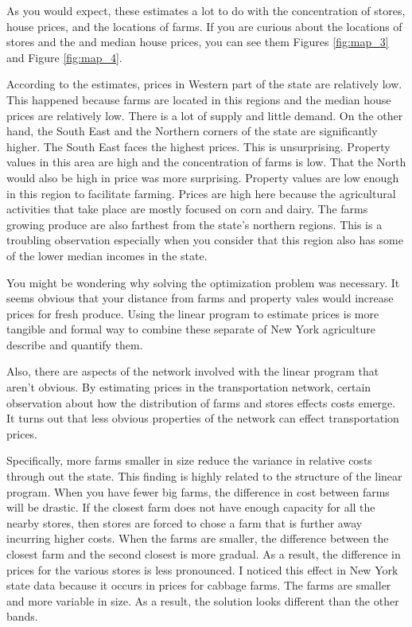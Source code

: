 \documentclass{report}
\begin{document}
As you would expect, these estimates a lot to do with the concentration of stores, house prices, and the locations of farms. If you are curious about the locations of stores and the and median house prices, you can see them Figures \ref{fig:map_3} and Figure \ref{fig:map_4}.

According to the estimates, prices in Western part of the state are relatively low. This happened because farms are located in this regions and the median house prices are relatively low. There is a lot of supply and little demand.  On the other hand, the South East and the Northern corners of the state are significantly higher. The South East faces the highest prices. This is unsurprising. Property values in this area are high and the concentration of farms is low. That the North would also be high in price was more surprising. Property values are low enough in this region to facilitate farming.  Prices are high here because the agricultural activities that take place are mostly focused on corn and dairy. The farms growing produce are also farthest from the state's northern regions. This is a troubling observation especially when you consider that this region also has some of the lower median incomes in the state. 

You might be wondering why solving the optimization problem was necessary. It seems obvious that your distance from farms and property vales would increase prices for fresh produce. Using the linear program to estimate prices is more tangible and formal way to combine these separate of New York agriculture describe and quantify them. 

Also, there are aspects of the network involved with the linear program that aren't obvious. By estimating prices in the transportation network, certain observation about how the distribution of farms and stores effects costs emerge. It turns out that less obvious properties of the network can effect transportation prices. 

Specifically, more farms smaller in size reduce the variance in relative costs through out the state. This finding is highly related to the structure of the linear program. When you have fewer big farms, the difference in cost between farms will be drastic. If the closest farm does not have enough capacity for all the nearby stores, then stores are forced to chose a farm that is further away incurring higher costs. When the farms are smaller, the difference between the closest farm and the second closest is more gradual. As a result, the difference in prices for the various stores is less pronounced. I noticed this effect in New York state data because it occurs in  prices for cabbage farms. The farms are smaller and more variable in size. As a result, the solution looks different than the other bands.
\end{document}
